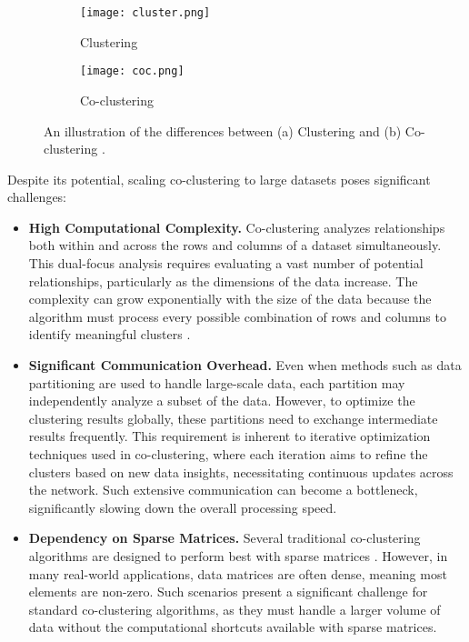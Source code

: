 \begin{figure}[htbp]
    \centering
    \begin{subfigure}[b]{0.22\textwidth}
        \texttt{[image: cluster.png]}
        \caption{Clustering}
        \label{fig:cluster}
    \end{subfigure}
    \hfill
    \begin{subfigure}[b]{0.22\textwidth}
        \texttt{[image: coc.png]}
        \caption{Co-clustering}
        \label{fig:cocluster}
    \end{subfigure}
    \caption{An illustration of the differences between (a) Clustering and (b) Co-clustering \cite{yan2017CoclusteringMultidimensionalBig}.}
    \label{fig:cocomparison}
\end{figure}

Despite its potential, scaling co-clustering to large datasets poses significant challenges:

\begin{itemize}
    \item{\textbf{High Computational Complexity.}} Co-clustering analyzes relationships both within and across the rows and columns of a dataset simultaneously. This dual-focus analysis requires evaluating a vast number of potential relationships, particularly as the dimensions of the data increase. The complexity can grow exponentially with the size of the data because the algorithm must process every possible combination of rows and columns to identify meaningful clusters \cite{hansen2011NonparametricCoclusteringLarge}.
    \item{\textbf{Significant Communication Overhead.}} Even when methods such as data partitioning are used to handle large-scale data, each partition may independently analyze a subset of the data. However, to optimize the clustering results globally, these partitions need to exchange intermediate results frequently. This requirement is inherent to iterative optimization techniques used in co-clustering, where each iteration aims to refine the clusters based on new data insights, necessitating continuous updates across the network. Such extensive communication can become a bottleneck, significantly slowing down the overall processing speed.
    \item{\textbf{Dependency on Sparse Matrices.}} Several traditional co-clustering algorithms are designed to perform best with sparse matrices \cite{pan2008CRDFastCoclustering}. However, in many real-world applications, data matrices are often dense, meaning most elements are non-zero. Such scenarios present a significant challenge for standard co-clustering algorithms, as they must handle a larger volume of data without the computational shortcuts available with sparse matrices.
\end{itemize}

